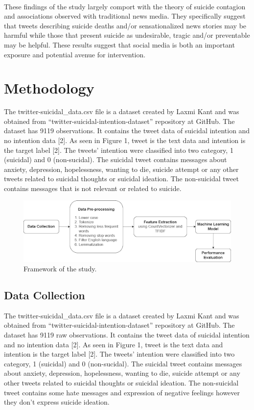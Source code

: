 \documentclass[runningheads]{llncs}
\begin{document}
\paragraph{}
These findings of the study largely comport with the theory of suicide contagion and associations observed with traditional news media. They specifically suggest that tweets describing suicide deaths and/or sensationalized news stories may be harmful while those that present suicide as undesirable, tragic and/or preventable may be helpful. These results suggest that social media is both an important exposure and potential avenue for intervention. 

\section{Methodology}
The twitter-suicidal\_data.csv file is a dataset created by Laxmi Kant and was obtained from “twitter-suicidal-intention-dataset” repository at GitHub. The dataset has 9119 observations. It contains the tweet data of suicidal intention and no intention data [2]. As seen in Figure 1, tweet is the text data and intention is the target label [2]. The tweets’ intention were classified into two category, 1 (suicidal) and 0 (non-sucidal). The suicidal tweet contains messages about anxiety, depression, hopelessness, wanting to die, suicide attempt or any other tweets related to suicidal thoughts or suicidal ideation. The non-suicidal tweet contains messages that is not relevant or related to suicide.
\begin{figure}
    \includegraphics[width=\textwidth]{framework.png}
    \caption{Framework of the study.} \label{fig1}
\end{figure}

\subsection{Data Collection}
The twitter-suicidal\_data.csv file is a dataset created by Laxmi Kant and was obtained from “twitter-suicidal-intention-dataset” repository at GitHub. The dataset has 9119 raw observations. It contains the tweet data of suicidal intention and no intention data [2]. As seen in Figure 1, tweet is the text data and intention is the target label [2]. The tweets’ intention were classified into two category, 1 (suicidal) and 0 (non-sucidal). The suicidal tweet contains messages about anxiety, depression, hopelessness, wanting to die, suicide attempt or any other tweets related to suicidal thoughts or suicidal ideation. The non-suicidal tweet contains some hate messages and expression of negative feelings however they don’t express suicide ideation.
\end{document}
